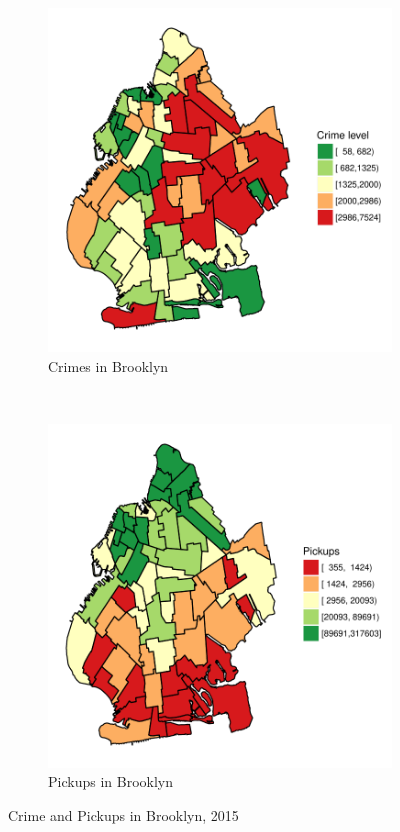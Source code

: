 \documentclass{sigkddExp}
\begin{document}
\begin{figure}
    \centering
    \begin{subfigure}[t]{0.5\textwidth}
        \centering
        \includegraphics[width=.9\textwidth]{../img/crimes_per_zone_2015_Brooklyn}
        \caption{Crimes in Brooklyn}
    \end{subfigure}%
    ~ 
    \begin{subfigure}[t]{0.5\textwidth}
        \centering
        \includegraphics[width=.9\textwidth]{../img/taxis_2015_Brooklyn}
        \caption{Pickups in Brooklyn}
    \end{subfigure}
    \caption{Crime and Pickups in Brooklyn, 2015}
    \label{Brooklyn}
  \end{figure}
\end{document}

